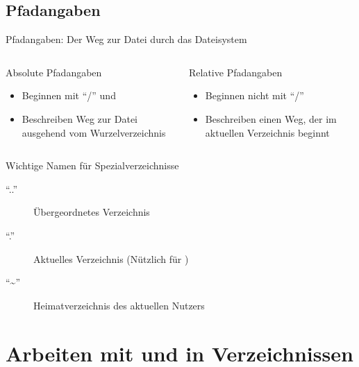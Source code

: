 \documentclass[aspectratio=43]{beamer}
\begin{document}
\subsection{Pfadangaben}
\begin{frame}{Pfadangaben: Der Weg zur Datei durch das Dateisystem}
  \begin{columns}
    \begin{column}{0.5\textwidth}
      \begin{block}{Absolute Pfadangaben}
        \begin{itemize}
          \item Beginnen mit "`/"' und 
          \item Beschreiben Weg zur Datei ausgehend vom Wurzelverzeichnis
        \end{itemize}
      \end{block}
    \end{column}
    \begin{column}{0.5\textwidth}
      \begin{block}{Relative Pfadangaben}
        \begin{itemize}
          \item Beginnen nicht mit "`/"'
          \item Beschreiben einen Weg, der im aktuellen Verzeichnis beginnt
        \end{itemize}    
      \end{block}
    \end{column}
  \end{columns}
  \begin{block}{Wichtige Namen für Spezialverzeichnisse}
  \begin{description}
    \item["`.."'] Übergeordnetes Verzeichnis
    \item["`."'] Aktuelles Verzeichnis (Nützlich für )
    \item["`\textasciitilde"'] Heimatverzeichnis des aktuellen Nutzers
  \end{description}
  \end{block}
\end{frame}


\section{Arbeiten mit und in Verzeichnissen}
\end{document}
